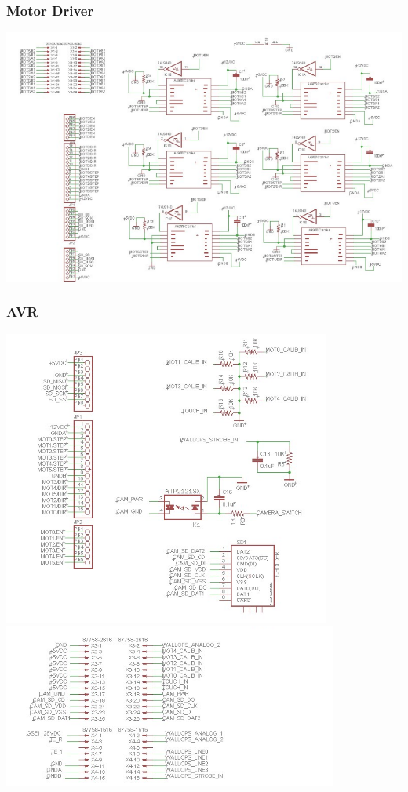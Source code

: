 \subsubsection{Motor Driver}
\includegraphics[width=\textwidth]{./images/EESchems/motorDriver}
\subsubsection{AVR}
\includegraphics[scale=.4]{./images/EESchems/AVR1}
\includegraphics[scale=.4]{./images/EESchems/AVR2}

